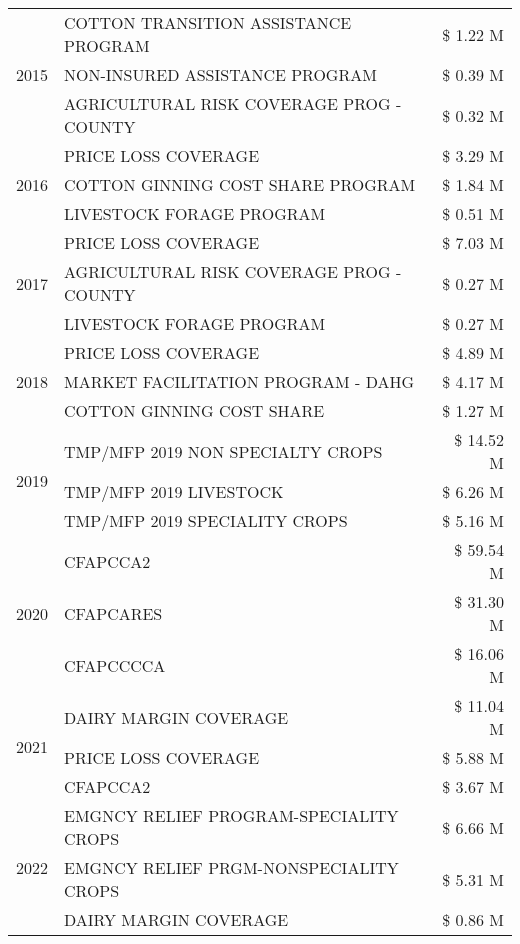 \begin{tabular}{llr}
\cline{1-3}
\multirow[t]{3}{*}{2015} & COTTON TRANSITION ASSISTANCE PROGRAM & \$ 1.22 M \\
 & NON-INSURED ASSISTANCE PROGRAM & \$ 0.39 M \\
 & AGRICULTURAL RISK COVERAGE PROG - COUNTY & \$ 0.32 M \\
\cline{1-3}
\multirow[t]{3}{*}{2016} & PRICE LOSS COVERAGE & \$ 3.29 M \\
 & COTTON GINNING COST SHARE PROGRAM & \$ 1.84 M \\
 & LIVESTOCK FORAGE PROGRAM & \$ 0.51 M \\
\cline{1-3}
\multirow[t]{3}{*}{2017} & PRICE LOSS COVERAGE & \$ 7.03 M \\
 & AGRICULTURAL RISK COVERAGE PROG - COUNTY & \$ 0.27 M \\
 & LIVESTOCK FORAGE PROGRAM & \$ 0.27 M \\
\cline{1-3}
\multirow[t]{3}{*}{2018} & PRICE LOSS COVERAGE & \$ 4.89 M \\
 & MARKET FACILITATION PROGRAM - DAHG & \$ 4.17 M \\
 & COTTON GINNING COST SHARE & \$ 1.27 M \\
\cline{1-3}
\multirow[t]{3}{*}{2019} & TMP/MFP 2019 NON SPECIALTY CROPS & \$ 14.52 M \\
 & TMP/MFP 2019 LIVESTOCK & \$ 6.26 M \\
 & TMP/MFP 2019 SPECIALITY CROPS & \$ 5.16 M \\
\cline{1-3}
\multirow[t]{3}{*}{2020} & CFAPCCA2 & \$ 59.54 M \\
 & CFAPCARES & \$ 31.30 M \\
 & CFAPCCCCA & \$ 16.06 M \\
\cline{1-3}
\multirow[t]{3}{*}{2021} & DAIRY MARGIN COVERAGE & \$ 11.04 M \\
 & PRICE LOSS COVERAGE & \$ 5.88 M \\
 & CFAPCCA2 & \$ 3.67 M \\
\cline{1-3}
\multirow[t]{3}{*}{2022} & EMGNCY RELIEF PROGRAM-SPECIALITY CROPS & \$ 6.66 M \\
 & EMGNCY RELIEF PRGM-NONSPECIALITY CROPS & \$ 5.31 M \\
 & DAIRY MARGIN COVERAGE & \$ 0.86 M \\
\cline{1-3}
\bottomrule
\end{tabular}
